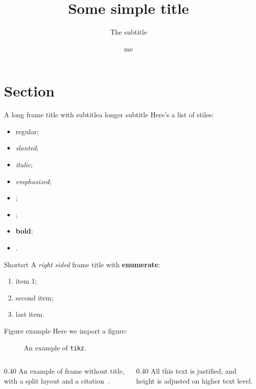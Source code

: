 \documentclass[banner={uniud},handout]{presenta}
\title{Some simple title}
\author{me}
\subtitle{The subtitle}
\begin{document}
\maketitle

\tableofcontents

\section{Section}

\begin{frame}{A long frame title with subtitle}{a longer subtitle}
  Here's a list of stiles:
  \begin{itemize}
    \item regular;
    \item \textsl{slanted};
    \item \textit{italic};
    \item \emph{emphasized};
    \item {};
    \item {};
    \item \textbf{bold};
    \item {}.
  \end{itemize}
\end{frame}

\begin{frame}[right]{Short}{srt}
  A \textit{right sided} frame title with \textbf{enumerate}:
  \begin{enumerate}
    \item item 1;
    \pause
    \item second item;
    \pause
    \item last item.
  \end{enumerate}
\end{frame}

\begin{frame}{Figure example}
  Here we import a figure:
  \begin{figure}[H]
    
    \caption{An example of \texttt{tikz}.}
  \end{figure}
\end{frame}

\begin{frame}
  \begin{columns}
    \hfill
    \begin{column}[t]{0.40\paperwidth}
      \justifying
      An example of frame without title, with a split layout and a citation~\cite{example1}.
    \end{column}
    \hfill
    \begin{column}[t]{0.40\paperwidth}
      \justifying
      All this text is justified\footnotemark, and height is adjusted on higher text level.
    \end{column}
    \hfill
  \end{columns}
\end{frame}
\end{document}
